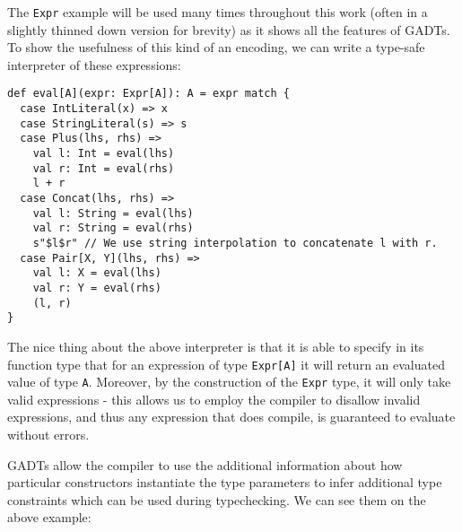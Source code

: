 The \texttt{Expr} example will be used many times throughout this work (often in a slightly thinned down version for brevity) as it shows all the features of GADTs.
To show the usefulness of this kind of an encoding, we can write a type-safe interpreter of these expressions:

\label{evaldef}
\begin{lstlisting}[style=scala]
def eval[A](expr: Expr[A]): A = expr match {
  case IntLiteral(x) => x
  case StringLiteral(s) => s
  case Plus(lhs, rhs) => 
    val l: Int = eval(lhs)
    val r: Int = eval(rhs)
    l + r
  case Concat(lhs, rhs) =>
    val l: String = eval(lhs)
    val r: String = eval(rhs)
    s"$l$r" // We use string interpolation to concatenate l with r.
  case Pair[X, Y](lhs, rhs) =>
    val l: X = eval(lhs)
    val r: Y = eval(rhs)
    (l, r)
}
\end{lstlisting}

The nice thing about the above interpreter is that it is able to specify in its function type that for an expression of type \texttt{Expr[A]} it will return an evaluated value of type \texttt{A}. Moreover, by the construction of the \texttt{Expr} type, it will only take valid expressions - this allows us to employ the compiler to disallow invalid expressions, and thus any expression that does compile, is guaranteed to evaluate without errors.

GADTs allow the compiler to use the additional information about how particular constructors instantiate the type parameters to infer additional type constraints which can be used during typechecking. We can see them on the above example:

